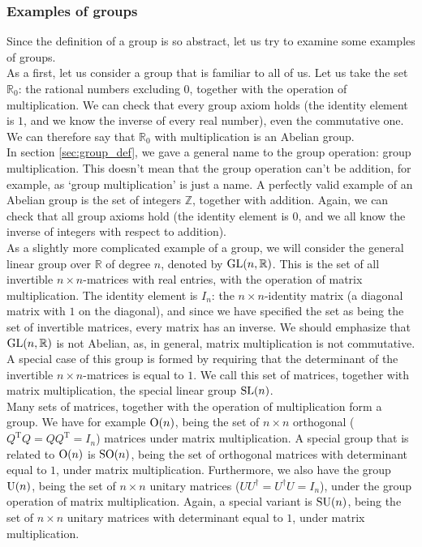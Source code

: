         \subsubsection{Examples of groups}
            Since the definition of a group is so abstract, let us try to examine some examples of groups. \\

            As a first, let us consider a group that is familiar to all of us. Let us take the set $\mathbb{R}_0$: the rational numbers excluding $0$, together with the operation of multiplication. We can check that every group axiom holds (the identity element is $1$, and we know the inverse of every real number), even the commutative one. We can therefore say that $\mathbb{R}_0$ with multiplication is an Abelian group. \\

            In section \ref{sec:group_def}, we gave a general name to the group operation: group multiplication. This doesn't mean that the group operation can't be addition, for example, as `group multiplication' is just a name. A perfectly valid example of an Abelian group is the set of integers $\mathbb{Z}$, together with addition. Again, we can check that all group axioms hold (the identity element is $0$, and we all know the inverse of integers with respect to addition). \\

            As a slightly more complicated example of a group, we will consider the general linear group over $\mathbb{R}$ of degree $n$, denoted by $\operatorname{GL}(n, \mathbb{R})$. This is the set of all invertible $n \times n$-matrices with real entries, with the operation of matrix multiplication. The identity element is $I_n$: the $n \times n$-identity matrix (a diagonal matrix with $1$ on the diagonal), and since we have specified the set as being the set of invertible matrices, every matrix has an inverse. We should emphasize that $\operatorname{GL}(n, \mathbb{R})$ is not Abelian, as, in general, matrix multiplication is not commutative. A special case of this group is formed by requiring that the determinant of the invertible $n \times n$-matrices is equal to $1$. We call this set of matrices, together with matrix multiplication, the special linear group $\operatorname{SL}(n)$. \\

            Many sets of matrices, together with the operation of multiplication form a group. We have for example $\operatorname{O}(n)$, being the set of $n \times n$ orthogonal ($Q^\text{T} Q = Q Q^\text{T} = I_n$) matrices under matrix multiplication. A special group that is related to $\operatorname{O}(n)$ is $\operatorname{SO}(n)$, being the set of orthogonal matrices with determinant equal to $1$, under matrix multiplication. Furthermore, we also have the group $\operatorname{U}(n)$, being the set of $n \times n$ unitary matrices ($U U^\dagger = U^\dagger U = I_n$), under the group operation of matrix multiplication. Again, a special variant is $\operatorname{SU}(n)$, being the set of $n \times n$ unitary matrices with determinant equal to $1$, under matrix multiplication. \\

